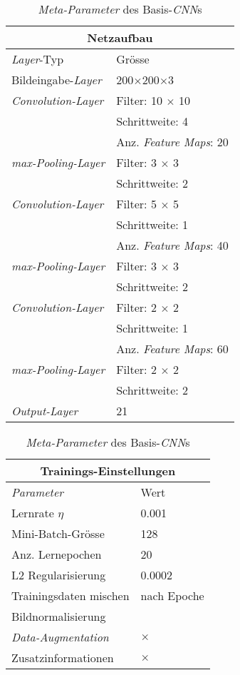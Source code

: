 \begin{table}[!htb]
	\def\arraystretch{1.4}
	\centering
	\begin{subtable}[t]{.5\linewidth}
		\begin{tabular}[t]{l | l }
			\multicolumn{2}{c}{\textbf{Netzaufbau}}\\
			\hline
			\textit{Layer}-Typ & Grösse\\
			\hline
			\hline
			Bildeingabe-\textit{Layer} & 200$\times$200$\times$3\\
			\hline
			\textit{Convolution-Layer}& Filter: 10 $\times$ 10\\
									  & Schrittweite: 4\\
									  & Anz. \textit{Feature Maps}: 20\\
			\hline
			\textit{max-Pooling-Layer}& Filter: 3 $\times$ 3\\
									  & Schrittweite: 2\\
			
			\hline
			\textit{Convolution-Layer}& Filter: 5 $\times$ 5\\
									  & Schrittweite: 1\\
									  & Anz. \textit{Feature Maps}: 40\\
			\hline
			\textit{max-Pooling-Layer}& Filter: 3 $\times$ 3\\
									  & Schrittweite: 2\\
			\hline
			\textit{Convolution-Layer}& Filter: 2 $\times$ 2\\
									  & Schrittweite: 1\\
									  & Anz. \textit{Feature Maps}: 60\\
			\hline
			\textit{max-Pooling-Layer}& Filter: 2 $\times$ 2\\
									  & Schrittweite: 2\\
			\hline
			\textit{Output-Layer}   & 21\\
		\end{tabular}
	\end{subtable}%
	\begin{subtable}[t]{.5\linewidth}
		\begin{tabular}[t]{l | l }
			\multicolumn{2}{c}{\textbf{Trainings-Einstellungen}}\\
			\hline
			\textit{Parameter} & Wert\\
			\hline
			\hline
			Lernrate $\eta$ & 0.001\\
			Mini-Batch-Grösse & 128\\
			Anz. Lernepochen & 20\\
			L2 Regularisierung & 0.0002\\
			Trainingsdaten mischen& nach Epoche\\
			Bildnormalisierung & \checkmark\\
			\textit{Data-Augmentation}& $\times$ \\
			Zusatzinformationen &  $\times$ \\
		\end{tabular}
	\end{subtable} 
	\caption{\textit{Meta-Parameter} des Basis-\textit{CNN}s}
	\label{table:basic_cnn_training}
\end{table}


